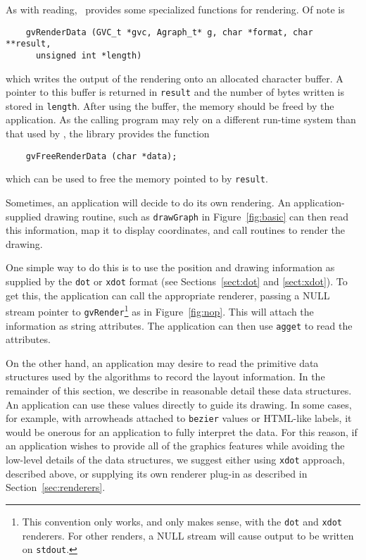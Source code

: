 As with reading, \gviz\ provides some specialized functions for rendering.
Of note is
\begin{verbatim}
    gvRenderData (GVC_t *gvc, Agraph_t* g, char *format, char **result, 
      unsigned int *length)
\end{verbatim}
which writes the output of the rendering onto an allocated character buffer. A pointer
to this buffer is returned in {\tt *result} and the number of bytes written is stored in
{\tt length}. After using the buffer, the memory should be freed by the application.
As the calling program may rely on a different run-time system than that used by
\gviz, the library provides the function 
\begin{verbatim}
    gvFreeRenderData (char *data); 
\end{verbatim}
which can be used to free the memory pointed to by {\tt *result}.

Sometimes, an application will decide to do its own rendering.
An application-supplied
drawing routine, such as {\tt drawGraph} in Figure~\ref{fig:basic}
can then read this information,
map it to display coordinates, and call routines to render the drawing.

One simple way to do this is to use the position and drawing information as
supplied by the {\tt dot} or {\tt xdot} format (see
Sections~\ref{sect:dot} and \ref{sect:xdot}). To get this, the application
can call the appropriate renderer, passing a NULL stream
pointer to {\tt gvRender}\footnote{
This convention only works, and only makes sense, with the {\tt dot} 
and {\tt xdot} renderers. For other renders, a NULL stream will cause
output to be written on {\tt stdout}.} as in Figure~\ref{fig:nop}.
This will attach the information as string attributes. The application
can then use {\tt agget} to read the attributes.

On the other hand, an application may desire to read the primitive
data structures used by the algorithms to record the layout information.
In the remainder of this section, 
we describe in reasonable detail these data structures.
An application can
use these values directly to guide its drawing. In some cases, for example,
with arrowheads attached to {\tt bezier} values or HTML-like labels, it
would be onerous for an application to fully interpret the data.
For this reason,
if an application wishes to provide all of the
graphics features while avoiding the low-level details of the data
structures, we suggest either using {\tt xdot} approach, described above,
or supplying its own renderer plug-in as described in
Section~\ref{sec:renderers}.


